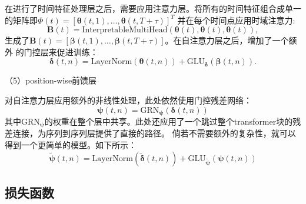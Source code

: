 在进行了时间特征处理层之后，需要应用注意力层。将所有的时间特征组合成单一的矩阵即$\bm{\varPhi }(t) = \left[ \bm{\theta} (t, 1), \ldots, \bm{\theta }(t, T+\tau) \right]^T$
并在每个时间点应用时域注意力:
\begin{equation}
    \mathbf{B}(t) = \text{InterpretableMultiHead}(\mathbf{\theta }(t), \mathbf{\theta }(t), \mathbf{\theta }(t)),
\end{equation}
生成了$\mathbf{B}(t) = \left[ \mathbf{\beta }(t, 1), \ldots, \mathbf{\beta }(t, T+\tau) \right]$。在自注意力层之后，增加了一个额外
的门控层来促进训练：
\begin{equation}
    \boldsymbol{\delta}(t, n) = \text{LayerNorm}(\boldsymbol{\theta }(t, n)) + \text{GLU}_{\boldsymbol{\delta}}(\boldsymbol{\beta}(t, n)).
\end{equation}

（5）position-wise前馈层

对自注意力层应用额外的非线性处理，此处依然使用门控残差网络：
\begin{equation}
    \boldsymbol{\psi}(t, n) = \text{GRN}_{\boldsymbol{\psi}}(\boldsymbol{\delta}(t, n))
\end{equation}
其中$ \text{GRN}_{\boldsymbol{\psi}}$的权重在整个层中共享。此处还应用了一个跳过整个transformer块的残差连接，为序列到序列层提供了直接的路径。
倘若不需要额外的复杂性，就可以得到一个更简单的模型。如下所示：
\begin{equation}
    \tilde{\boldsymbol{\psi}}(t, n) = \text{LayerNorm}(\tilde{\boldsymbol{\delta}}(t, n)) + \text{GLU}_{\tilde{\boldsymbol{\psi}}}({\boldsymbol{\psi}}(t, n))
\end{equation}

\subsection{损失函数}

